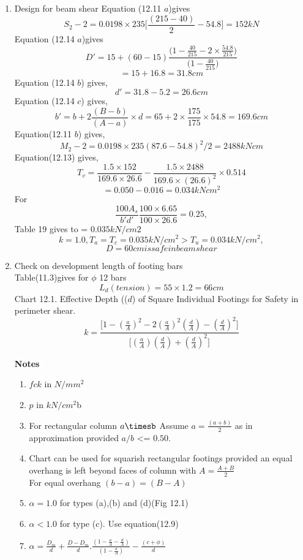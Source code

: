 \documentclass{book}
\begin{document}
\begin{enumerate}
\item Design for beam shear
  Equation (12.11 $a$)gives
  $$S_2-2=0.0198\times235\Bigg[\frac{(215-40)}{2}-54.8\Bigg]=152 kN$$
  Equation (12.14 $a$)gives
  $$D'=15+(60-15)\frac{\Bigg(1-\frac{40}{215}-2\times \frac{54.8}{215}\Bigg)}{\Bigg(1-\frac{40}{215}\Bigg)}$$
  $$=15+16.8=31.8 cm$$
  Equation (12.14 $b$) gives,
  $$ d'=31.8-5.2=26.6 cm$$
  Equation (12.14 $c$) gives,
  $$b'=b+2\frac{(B-b)}{(A-a)}\times d=65+2\times \frac{175}{175}\times 54.8=169.6 cm$$
  Equation(12.11 $b$) gives,
  $$M_2-2=0.0198\times 235(87.6-54.8)^2/2=2488 kN cm$$ 
  Equation(12.13) gives,
  $$T_v=\frac{1.5\times 152}{169.6\times26.6}-\frac{1.5\times 2488}{169.6\times (26.6)^2}\times 0.514$$
  $$=0.050-0.016=0.034 kN cm^2$$
  For
  $$\frac{100A_s}{b'd'}\frac{100\times6.65}{100\times26.6}=0.25,$$
  Table 19 gives to = $0.035 kN/cm2$
  $$k=1.0, T_a=T_c=0.035 kN/cm^2>T_u=0.034 kN/cm^2,$$
$$D=60 cm is safe in beam shear$$  
  
\item Check on development length of footing bars\\
Table(11.3)gives for $\phi$ 12 bars
$$L_d(tension)=55\times1.2=66cm$$
Chart 12.1. Effective Depth (($d$) of Square Individual Footings for Safety in perimeter shear.
$$k=\frac{\Bigg[1-\left(\frac{a}{A}\right)^2
-2\left(\frac{a}{A}\right)^2\left( \frac{d}{A}\right)-\left(\frac{d}{A}\right)^2\Bigg]}{\Bigg[\left(\frac{a}{A}\right)\left(\frac{d}{A}\right)+\left(\frac{d}{A}\right)^2\Bigg]}$$

\textbf{Notes}
\begin{enumerate}
\item  $fck$ in $N/mm^2$
\item $p$ in $kN/cm^2$b
\item For rectangular column $a\timesb$
Assume $a=\frac{(a+b)}{2}$ as in approximation provided $a/b$ <= $0.50.$
\item Chart can be used for squarish rectangular footings provided an equal overhang is left beyond faces of column with $A=\frac{A+B}{2}$\\
For equal overhang $(b-a)=(B-A)$
\item $\alpha=1.0$ for types (a),(b) and (d)(Fig 12.1)
\item $\alpha<1.0$ for type (c). Use equation(12.9)
\item $\alpha=\frac{D_m}{d}+\frac{D-D_m}{d}.\frac{\left(1-\frac{a}{A}-\frac{d}{A}\right)}{\left(1-\frac{a}{A}\right)}-\frac{(c+\phi)}{d}$

\end{enumerate}


\end{enumerate}
\end{document}
